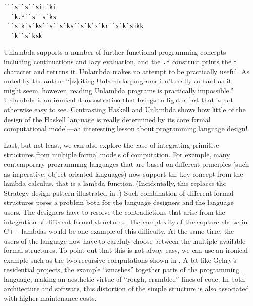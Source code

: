 \begin{lstlisting}
```s``s``sii`ki
  `k.*``s``s`ks
 ``s`k`s`ks``s``s`ks``s`k`s`kr``s`k`sikk
  `k``s`ksk
\end{lstlisting}

Unlambda supports a number of further functional programming concepts including continuations
and lazy evaluation, and the \texttt{.*} construct prints the \texttt{*} character and returns it.
Unlambda makes no attempt to be practically useful. As noted by the author ``[w]riting Unlambda
programs isn't really as hard as it might seem; however, reading Unlambda programs is practically
impossible.''
Unlambda is an ironical demonstration that brings to light a fact that is not otherwise easy
to see. Contrasting Haskell and Unlambda shows how little of the design of the Haskell language is
really determined by its core formal computational model---an interesting lesson about programming
language design!


Last, but not least, we can also explore the case of integrating primitive structures from multiple
formal models of computation. For example, many contemporary programming languages that are based
on different principles (such as imperative, object-oriented languages) now support the
key concept from the lambda calculus, that is a lambda function. (Incidentally, this replaces
the Strategy design pattern illustrated in .) Such combination of
different formal structures poses a problem both for the language designers and the language users.
The designers have to resolve the contradictions that arise from the integration of different
formal structures. The complexity of the capture clause in C++ lambdas would be one example
of this difficulty.
At the same time, the users of the language now have to carefuly choose between the multiple
available formal structures. To point out that this is not alway easy, we can use an ironical
example such as the two recursive computations shown in .
A bit like Gehry's residential projects, the
example ``smashes'' together parts of the programming language, making an aesthetic virtue of
``rough, crumbled'' lines of code. In both architecture and software, this distortion of the
simple structure is also associated with higher maintenance costs.

